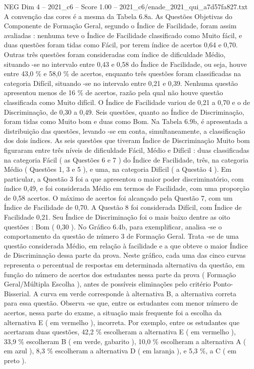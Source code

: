 \begin{textsample}{NEG Dim 4 – 2021\_c6 – Score 1.00 – 2021\_c6/enade\_2021\_qui\_a7d57fa827.txt}
A convenção das cores é a mesma da Tabela 6.8a.
As Questões Objetivas do Componente de Formação Geral, segundo o Índice de Facilidade, foram assim avaliadas : nenhuma teve o Índice de Facilidade classificado como Muito fácil, e duas questões foram tidas como Fácil, por terem índice de acertos 0,64 e 0,70.
Outras três questões foram consideradas com índice de dificuldade Médio, situando -se no intervalo entre 0,43 e 0,58 do Índice de Facilidade, ou seja, houve entre 43,0 \% e 58,0 \% de acertos, enquanto três questões foram classificadas na categoria Difícil, situando -se no intervalo entre 0,21 e 0,39.
Nenhuma questão apresentou menos de 16 \% de acertos, razão pela qual não houve questão classificada como Muito difícil.
O Índice de Facilidade variou de 0,21 a 0,70 e o de Discriminação, de 0,30 a 0,49.
Seis questões, quanto ao Índice de Discriminação, foram tidas como Muito bom e duas como Bom.
Na Tabela 6.9b, é apresentada a distribuição das questões, levando -se em conta, simultaneamente, a classificação dos dois índices.
As seis questões que tiveram Índice de Discriminação Muito bom figuraram entre três níveis de dificuldade Fácil, Médio e Difícil : duas classificadas na categoria Fácil ( as Questões 6 e 7 ) do Índice de Facilidade, três, na categoria Médio ( Questões 1, 3 e 5 ), e uma, na categoria Difícil ( a Questão 4 ).
Em particular, a Questão 3 foi a que apresentou o maior poder discriminatório, com índice 0,49, e foi considerada Médio em termos de Facilidade, com uma proporção de 0,58 acertos.
O máximo de acertos foi alcançado pela Questão 7, com um Índice de Facilidade de 0,70.
A Questão 8 foi considerada Difícil, com Índice de Facilidade 0,21.
Seu Índice de Discriminação foi o mais baixo dentre as oito questões : Bom ( 0,30 ).
No Gráfico 6.4b, para exemplificar, analisa -se o comportamento da questão de número 3 de Formação Geral.
Trata -se de uma questão considerada Médio, em relação à facilidade e a que obteve o maior Índice de Discriminação dessa parte da prova.
Neste gráfico, cada uma das cinco curvas representa o percentual de respostas em determinada alternativa da questão, em função do número de acertos dos estudantes nessa parte da prova ( Formação Geral/Múltipla Escolha ), antes de possíveis eliminações pelo critério Ponto-Bisserial.
A curva em verde corresponde à alternativa B, a alternativa correta para essa questão.
Observa -se que, entre os estudantes com menor número de acertos, nessa parte do exame, a situação mais frequente foi a escolha da alternativa E ( em vermelho ), incorreta.
Por exemplo, entre os estudantes que acertaram duas questões, 42,2 \% escolheram a alternativa E ( em vermelho ), 33,9 \% escolheram B ( em verde, gabarito ), 10,0 \% escolheram a alternativa A ( em azul ), 8,3 \% escolheram a alternativa D ( em laranja ), e 5,3 \%, a C ( em preto ).

\end{textsample}
